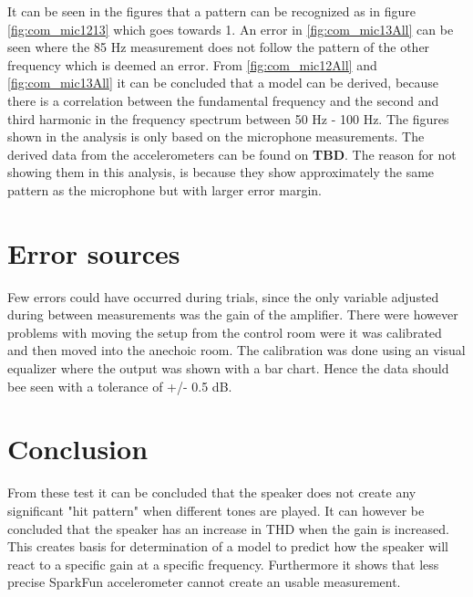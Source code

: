 It can be seen in the figures that a pattern can be recognized as in figure \autoref{fig:com_mic1213} which goes towards 1. An error in \autoref{fig:com_mic13All} can be seen where the 85 Hz measurement does not follow the pattern of the other frequency which is deemed an error. From \autoref{fig:com_mic12All} and \autoref{fig:com_mic13All} it can be concluded that a model can be derived, because there is a correlation between the fundamental frequency and the second and third harmonic in the frequency spectrum between 50 Hz - 100 Hz. The figures shown in the analysis is only based on the microphone measurements. The derived data from the accelerometers can be found on \textbf{TBD}. The reason for not showing them in this analysis, is because they show approximately the same pattern as the microphone but with larger error margin. 


\section{Error sources}
Few errors could have occurred during trials, since the only variable adjusted during between measurements was the gain of the amplifier. There were however problems with moving the setup from the control room were it was calibrated and then moved into the anechoic room. The calibration was done using an visual equalizer where the output was shown with a bar chart. Hence the data should bee seen with a tolerance of +/- 0.5 dB.

\section{Conclusion}

From these test it can be concluded that the speaker does not create any significant "hit pattern" when different tones are played. It can however be concluded that the speaker has an increase in THD when the gain is increased. This creates basis for determination of a model to predict how the speaker will react to a specific gain at a specific frequency. Furthermore it shows that less precise SparkFun accelerometer cannot create an usable measurement. 